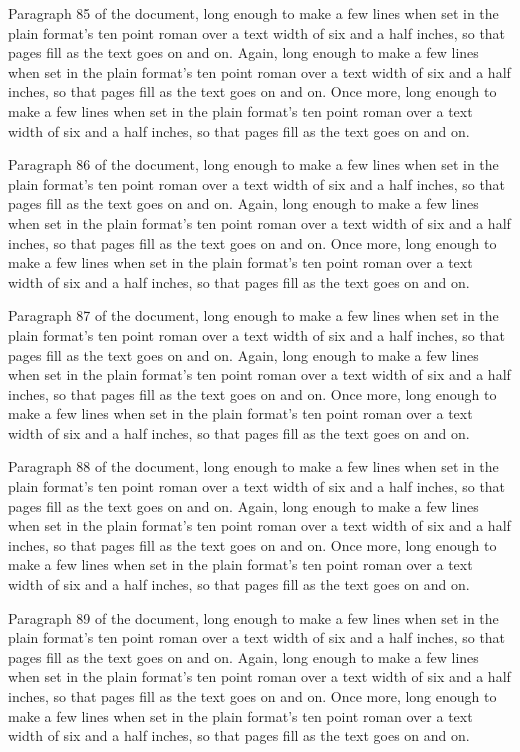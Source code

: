 Paragraph 85 of the document, long enough to make a few lines when set in the plain format's ten point roman over a text width of six and a half inches, so that pages fill as the text goes on and on. Again, long enough to make a few lines when set in the plain format's ten point roman over a text width of six and a half inches, so that pages fill as the text goes on and on. Once more, long enough to make a few lines when set in the plain format's ten point roman over a text width of six and a half inches, so that pages fill as the text goes on and on.

Paragraph 86 of the document, long enough to make a few lines when set in the plain format's ten point roman over a text width of six and a half inches, so that pages fill as the text goes on and on. Again, long enough to make a few lines when set in the plain format's ten point roman over a text width of six and a half inches, so that pages fill as the text goes on and on. Once more, long enough to make a few lines when set in the plain format's ten point roman over a text width of six and a half inches, so that pages fill as the text goes on and on.

Paragraph 87 of the document, long enough to make a few lines when set in the plain format's ten point roman over a text width of six and a half inches, so that pages fill as the text goes on and on. Again, long enough to make a few lines when set in the plain format's ten point roman over a text width of six and a half inches, so that pages fill as the text goes on and on. Once more, long enough to make a few lines when set in the plain format's ten point roman over a text width of six and a half inches, so that pages fill as the text goes on and on.

Paragraph 88 of the document, long enough to make a few lines when set in the plain format's ten point roman over a text width of six and a half inches, so that pages fill as the text goes on and on. Again, long enough to make a few lines when set in the plain format's ten point roman over a text width of six and a half inches, so that pages fill as the text goes on and on. Once more, long enough to make a few lines when set in the plain format's ten point roman over a text width of six and a half inches, so that pages fill as the text goes on and on.

Paragraph 89 of the document, long enough to make a few lines when set in the plain format's ten point roman over a text width of six and a half inches, so that pages fill as the text goes on and on. Again, long enough to make a few lines when set in the plain format's ten point roman over a text width of six and a half inches, so that pages fill as the text goes on and on. Once more, long enough to make a few lines when set in the plain format's ten point roman over a text width of six and a half inches, so that pages fill as the text goes on and on.

